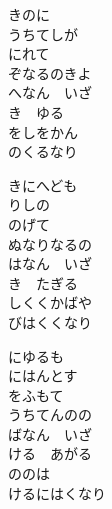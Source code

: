 \documentclass[10pt,b5j]{tarticle} %
\begin{document}
\vspace{1.5em} %
\newcommand{\linespace}{0.5em} %
\newcommand{\blocksize}{0.5\hsize} %
\begin{enumerate} %
    \begin{minipage}[c]{\blocksize}
    
        \vspace{\linespace}
        \item
        きのに\\
        うちてしが\\
        にれて\\
        ぞなるのきよ\\
        へなん　いざ\\
        き　ゆる\\
        をしをかん\\
        のくるなり
        
        \vspace{\linespace}
        \item
        きにへども\\
        りしの\\
        のげて\\
        ぬなりなるの\\
        はなん　いざ\\
        き　たぎる\\
        しくくかばや\\
        びはくくなり
        
        \vspace{\linespace}
        \item
        にゆるも\\
        にはんとす\\
        をふもて\\
        うちてんのの\\
        ばなん　いざ\\
        ける　あがる\\
        ののは\\
        けるにはくなり
        

\end{minipage}
\end{enumerate}
\end{document}
